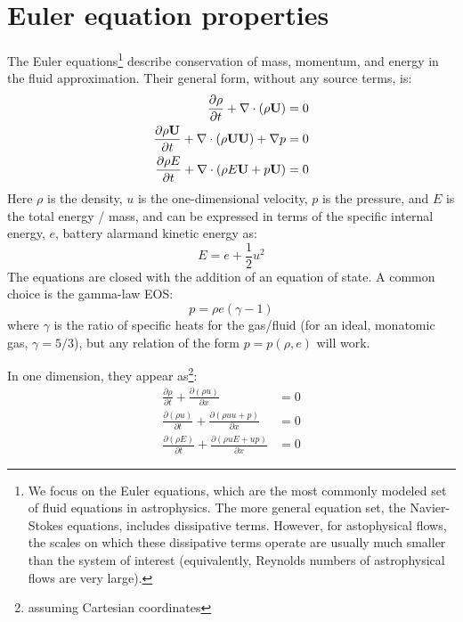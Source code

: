 \label{ch:compressible-theory}


\section{Euler equation properties}

The Euler equations\footnote{ We focus on the Euler equations, which  
are the most commonly modeled set of fluid equations in astrophysics.
The more general equation set, the Navier-Stokes equations, includes
dissipative terms.  However, for astophysical flows, the scales on
which these dissipative terms operate are usually much smaller than
the system of interest (equivalently, Reynolds numbers of
astrophysical flows are very large).} describe conservation of 
mass, momentum, and energy in the fluid approximation.  Their general
form, without any source terms, is:
\begin{align}
\frac{\partial \rho}{\partial t} + \nabla \cdot (\rho {\bf U}) &= 0 \\
\frac{\partial \rho {\bf U}}{\partial t} + \nabla \cdot (\rho {\bf U} {\bf U}) + \nabla p &= 0 \\
\frac{\partial \rho E}{\partial t} + \nabla \cdot (\rho E {\bf U} + p {\bf U} ) &= 0 
\end{align}
Here $\rho$ is the
density, $u$ is the one-dimensional velocity, $p$ is the pressure, and $E$
is the total energy / mass, and can be expressed in terms of the
specific internal energy, $e$, battery alarmand kinetic energy as:
\begin{equation}
E = e + \frac{1}{2} u^2
\end{equation}
The equations are closed with the addition of an equation of state.  A common
choice is the gamma-law EOS:
\begin{equation}
p = \rho e(\gamma - 1)
\end{equation}
where $\gamma$ is the ratio of specific heats for the gas/fluid (for
an ideal, monatomic gas, $\gamma = 5/3$), but any relation of the form
$p = p(\rho, e)$ will work.

In one dimension, they appear as\footnote{assuming Cartesian coordinates}:
\begin{align}
\frac{\partial \rho}{\partial t} +
    \frac{\partial (\rho u)}{\partial x} &= 0 \\
%
\frac{\partial(\rho u)}{\partial t} +
    \frac{\partial (\rho uu + p)}{\partial x} &= 0 \\
%
\frac{\partial(\rho E)}{\partial t} +
    \frac{\partial(\rho u E + u p)}{\partial x} &= 0
\end{align}

